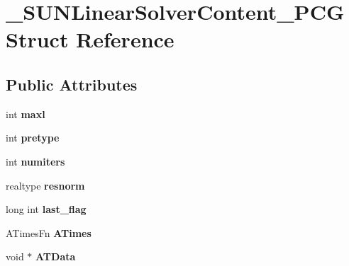 \hypertarget{struct__SUNLinearSolverContent__PCG}{}\section{\+\_\+\+S\+U\+N\+Linear\+Solver\+Content\+\_\+\+P\+CG Struct Reference}
\label{struct__SUNLinearSolverContent__PCG}
\subsection*{Public Attributes}
\begin{DoxyCompactItemize}
\item 
\mbox{\label{struct__SUNLinearSolverContent__PCG_a7c5cd087714ca7e813964969c0aa8357}} 
int {\bfseries maxl}
\item 
\mbox{\label{struct__SUNLinearSolverContent__PCG_a8746e43739626e829a64043b61d9b736}} 
int {\bfseries pretype}
\item 
\mbox{\label{struct__SUNLinearSolverContent__PCG_ac9cab9b33de5f89eb1f252743c5bdb42}} 
int {\bfseries numiters}
\item 
\mbox{\label{struct__SUNLinearSolverContent__PCG_a3c01405345b86545045f491556b5ea27}} 
realtype {\bfseries resnorm}
\item 
\mbox{\label{struct__SUNLinearSolverContent__PCG_affae750b259d91b5523849ba991d8177}} 
long int {\bfseries last\+\_\+flag}
\item 
\mbox{\label{struct__SUNLinearSolverContent__PCG_a3f5fa939035f5867b1398d5425d9c54d}} 
A\+Times\+Fn {\bfseries A\+Times}
\item 
\mbox{\label{struct__SUNLinearSolverContent__PCG_a2a687dc043ebe35d45f636b2d91aa3b5}} 
void $\ast$ {\bfseries A\+T\+Data}
\item 
\mbox{\label{struct__SUNLinearSolverContent__PCG_ab7687529914000a42749af6aebcc10a0}} 

\end{DoxyCompactItemize}
